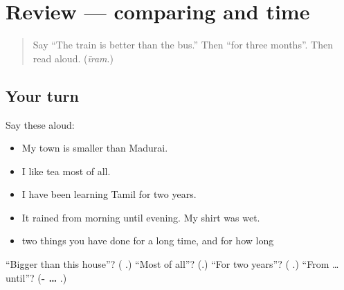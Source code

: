 \section[(review)]{Review — comparing and time}

\label{lesson:TA-R291-comparing-and-time}



\begin{quote}
Say \textquotedblleft{}The train is better than the bus.\textquotedblright{} Then \textquotedblleft{}for three months\textquotedblright{}. Then read \textbf{} aloud. (\emph{īram}.)
\end{quote}

\subsection*{Your turn}
Say these aloud:

\begin{itemize}
\raggedright
  \item My town is smaller than Madurai.
  \item I like tea most of all.
  \item I have been learning Tamil for two years.
  \item It rained from morning until evening. My shirt was wet.
  \item two things you have done for a long time, and for how long
\end{itemize}

\begin{tcolorbox}[breakable,colback=teal!4,colframe=teal!35!black,title={Before you move on}]
\textquotedblleft{}Bigger than this house\textquotedblright{}? (\textbf{  }.) \textquotedblleft{}Most of all\textquotedblright{}? (\textbf{}.) \textquotedblleft{}For two years\textquotedblright{}? (\textbf{ }.) \textquotedblleft{}From … until\textquotedblright{}? (\textbf{- … }.)
\end{tcolorbox}
